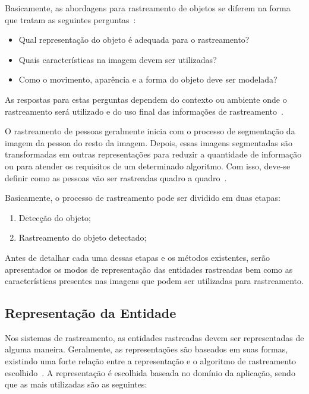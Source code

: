 	Basicamente, as abordagens para rastreamento de objetos se diferem na forma que tratam as seguintes perguntas~\cite{yilmaz}: 
		
		\begin{itemize}
			\item Qual representação do objeto é adequada para o rastreamento?
			\item Quais características na imagem devem ser utilizadas?
			\item Como o movimento, aparência e a forma do objeto deve ser modelada? 
		\end{itemize}

	As respostas para estas perguntas dependem do contexto ou ambiente onde o rastreamento será utilizado e do uso final das informações de rastreamento~\cite{yilmaz}.

	O rastreamento de pessoas geralmente inicia com o processo de segmentação da
	imagem da pessoa do resto da imagem. Depois, essas imagens segmentadas são
	transformadas em outras representações para reduzir a quantidade de informação
	ou para atender os requisitos de um determinado algoritmo. Com isso, deve-se definir como as
	pessoas vão ser rastreadas quadro a quadro~\cite{moeslund}.

	Basicamente, o processo de rastreamento pode ser dividido em duas etapas:

		\begin{enumerate}
			\item Detecção do objeto;
			\item Rastreamento do objeto detectado;
		\end{enumerate}

	Antes de detalhar cada uma dessas etapas e os métodos existentes, serão apresentados os modos de representação das entidades rastreadas bem como as características presentes nas imagens que podem ser utilizadas para rastreamento.


\subsection{Representação da Entidade}
\label{sec:representacao-objeto}

	Nos sistemas de rastreamento, as entidades rastreadas devem ser representadas de alguma maneira. Geralmente, as representações são baseados em suas formas, existindo uma forte relação entre a representação e o algoritmo de rastreamento escolhido~\cite{yilmaz}. A representação é escolhida baseada no domínio da aplicação, sendo que as mais utilizadas são as seguintes:

